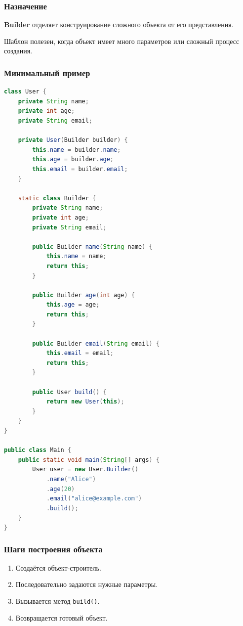 \documentclass[12pt,a4paper]{article}
\begin{document}
\subsubsection{Назначение}

\textbf{Builder} отделяет конструирование сложного объекта от его представления.

Шаблон полезен, когда объект имеет много параметров или сложный процесс создания.

\subsubsection{Минимальный пример}

\begin{lstlisting}[language=Java,caption={Builder}]
class User {
    private String name;
    private int age;
    private String email;

    private User(Builder builder) {
        this.name = builder.name;
        this.age = builder.age;
        this.email = builder.email;
    }

    static class Builder {
        private String name;
        private int age;
        private String email;

        public Builder name(String name) {
            this.name = name;
            return this;
        }

        public Builder age(int age) {
            this.age = age;
            return this;
        }

        public Builder email(String email) {
            this.email = email;
            return this;
        }

        public User build() {
            return new User(this);
        }
    }
}

public class Main {
    public static void main(String[] args) {
        User user = new User.Builder()
            .name("Alice")
            .age(20)
            .email("alice@example.com")
            .build();
    }
}
\end{lstlisting}

\subsubsection{Шаги построения объекта}

\begin{enumerate}
    \item Создаётся объект-строитель.
    \item Последовательно задаются нужные параметры.
    \item Вызывается метод \texttt{build()}.
    \item Возвращается готовый объект.
\end{enumerate}
\end{document}
